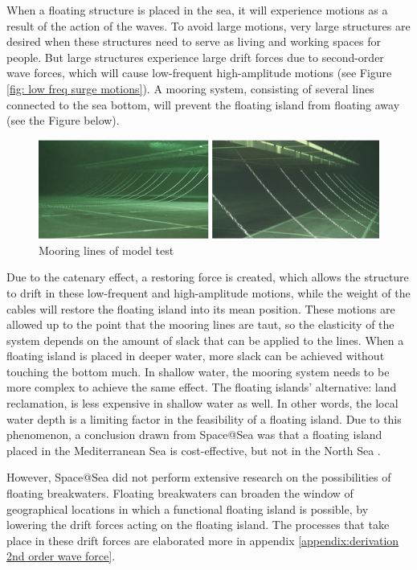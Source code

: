When a floating structure is placed in the sea, it will experience motions as a result of the action of the waves. To avoid large motions, very large structures are desired when these structures need to serve as living and working spaces for people. But large structures experience large drift forces due to second-order wave forces, which will cause low-frequent high-amplitude motions (see Figure \ref{fig: low freq surge motions}). A mooring system, consisting of several lines connected to the sea bottom, will prevent the floating island from floating away (see the Figure below). 
\begin{figure}[H]
    \centering
    \includegraphics[width=\linewidth]{figures/Literature_Introduction/mooringlines.PNG}
    \caption{Mooring lines of model test \parencite{S@S_demonstationatwavetank}}
    \label{fig:mooringlines}
\end{figure}

Due to the catenary effect, a restoring force is created, which allows the structure to drift in these low-frequent and high-amplitude motions, while the weight of the cables will restore the floating island into its mean position. These motions are allowed up to the point that the mooring lines are taut, so the elasticity of the system depends on the amount of slack that can be applied to the lines. When a floating island is placed in deeper water, more slack can be achieved without touching the bottom much. In shallow water, the mooring system needs to be more complex to achieve the same effect. The floating islands' alternative: land reclamation, is less expensive in shallow water as well. In other words, the local water depth is a limiting factor in the feasibility of a floating island. Due to this phenomenon, a conclusion drawn from Space@Sea was that a floating island placed in the Mediterranean Sea is cost-effective, but not in the North Sea \parencite{businessCase_S@S_D1.1}. 



However, Space@Sea did not perform extensive research on the possibilities of floating breakwaters. Floating breakwaters can broaden the window of geographical locations in which a functional floating island is possible, by lowering the drift forces acting on the floating island. The processes that take place in these drift forces are elaborated more in appendix \ref{appendix:derivation 2nd order wave force}.\\
\\
 
